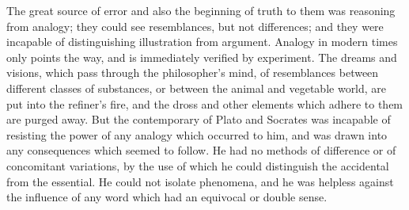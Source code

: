 \documentclass[11pt,letter]{article}
\begin{document}
\par  The great source of error and also the beginning of truth to them was reasoning from analogy; they could see resemblances, but not differences; and they were incapable of distinguishing illustration from argument. Analogy in modern times only points the way, and is immediately verified by experiment. The dreams and visions, which pass through the philosopher’s mind, of resemblances between different classes of substances, or between the animal and vegetable world, are put into the refiner’s fire, and the dross and other elements which adhere to them are purged away. But the contemporary of Plato and Socrates was incapable of resisting the power of any analogy which occurred to him, and was drawn into any consequences which seemed to follow. He had no methods of difference or of concomitant variations, by the use of which he could distinguish the accidental from the essential. He could not isolate phenomena, and he was helpless against the influence of any word which had an equivocal or double sense.
\end{document}
